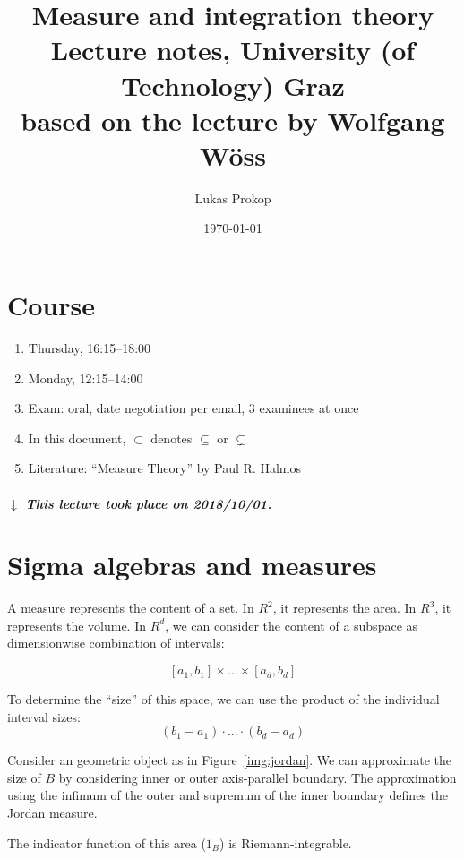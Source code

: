 \documentclass[a4paper]{article}
\title{
  Measure and integration theory \\
  \large{Lecture notes, University (of Technology) Graz} \\
  based on the lecture by Wolfgang W\"oss
}
\date{\today}
\author{Lukas Prokop}
\numberwithin{lecref}{section}
\theoremstyle{break}
\newcommand{\dateref}[1]{%
  \begin{mdframed}[backgroundcolor=gray!10,innerbottommargin=0pt,innertopmargin=0pt]
    \paragraph{\textit{$\downarrow$ This lecture took place on #1.}}%
  \end{mdframed}%
}
\begin{document}
\newcommand\gen{{\mathcal E}}
\renewcommand\setminus{\,{\textbackslash{}}\,} %

\maketitle
\tableofcontents

\section{Course}

\begin{enumerate}
  \item Thursday, 16:15--18:00
  \item Monday, 12:15--14:00
  \item Exam: oral, date negotiation per email, 3 examinees at once
  \item In this document, $\subset$ denotes $\subseteq$ or $\subsetneq$
  \item Literature: \enquote{Measure Theory} by Paul R. Halmos
\end{enumerate}

\dateref{2018/10/01}

\section{Sigma algebras and measures}

A measure represents the content of a set. In $R^2$, it represents the area. In $R^3$, it represents the volume. In $R^d$, we can consider the content of a subspace as dimensionwise combination of intervals:

\[ [a_1, b_1] \times \dots \times [a_d, b_d] \]

To determine the \enquote{size} of this space, we can use the product of the individual interval sizes:
\[ (b_1 - a_1) \cdot \dots \cdot (b_d - a_d) \]

Consider an geometric object as in Figure~\ref{img:jordan}.
We can approximate the size of $B$ by considering inner or outer axis-parallel boundary.
The approximation using the infimum of the outer and supremum of the inner boundary defines the Jordan measure.

The indicator function of this area ($1_B$) is Riemann-integrable.
\end{document}
